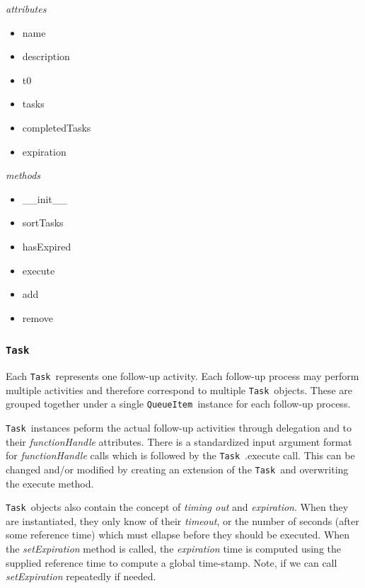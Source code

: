\documentclass{article}
\newcommand{\QueueItem}{\texttt{QueueItem}~}
\newcommand{\Task}{\texttt{Task}~}
\begin{document}
\noindent
\textit{attributes}

\begin{itemize}
    \item{name}
    \item{description}
    \item{t0}
    \item{tasks}
    \item{completedTasks}
    \item{expiration}
\end{itemize}

\noindent
\textit{methods}

\begin{itemize}
    \item{\_\_init\_\_}
    \item{sortTasks}
    \item{hasExpired}
    \item{execute}
    \item{add}
    \item{remove}
\end{itemize}


\subsubsection{\Task}
\label{sec: Task}

Each \Task represents one follow-up activity.
Each follow-up process may perform multiple activities and therefore correspond to multiple \Task objects.
These are grouped together under a single \QueueItem instance for each follow-up process.

\Task instances peform the actual follow-up activities through delegation and to their \textit{functionHandle} attributes.
There is a standardized input argument format for \textit{functionHandle} calls which is followed by the \Task.execute call.
This can be changed and/or modified by creating an extension of the \Task and overwriting the execute method.

\Task objects also contain the concept of \textit{timing out} and \textit{expiration}.
When they are instantiated, they only know of their \textit{timeout}, or the number of seconds (after some reference time) which must ellapse before they should be executed.
When the \textit{setExpiration} method is called, the \textit{expiration} time is computed using the supplied reference time to compute a global time-stamp.
Note, if we can call \textit{setExpiration} repeatedly if needed.
\end{document}
